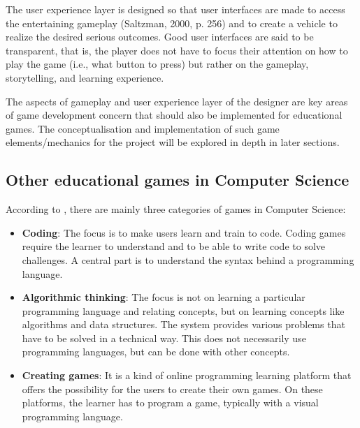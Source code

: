 The user experience layer is designed so that user interfaces are made to access the entertaining gameplay (Saltzman, 2000, p. 256) and to create a vehicle to realize the desired serious outcomes. Good user interfaces are said to be transparent, that is, the player does not have to focus their attention on how to play the game (i.e., what button to press) but rather on the gameplay, storytelling, and learning experience.

The aspects of gameplay and user experience layer of the designer are key areas of game development concern that should also be implemented for educational games. The conceptualisation and implementation of such game elements/mechanics for the project will be explored in depth in later sections.

\subsection{Other educational games in Computer Science}
According to \cite{combefis2016learning}, there are mainly three categories of games in Computer Science:
\begin{itemize}
    \item \textbf{Coding}: The focus is to make users learn and train to code. Coding games require the learner to understand and to be able to write code to solve challenges. A central part is to understand the syntax behind a programming language.
    \item \textbf{Algorithmic thinking}: The focus is not on learning a particular programming language and relating concepts, but on learning concepts like algorithms and data structures. The system provides various problems that have to be solved in a technical way. This does not necessarily use programming languages, but can be done with other concepts.
    \item \textbf{Creating games}:  It is a kind of online programming learning platform that offers the possibility for the users to create their own games. On these platforms, the learner has to program a game, typically with a visual programming language. 
\end{itemize}